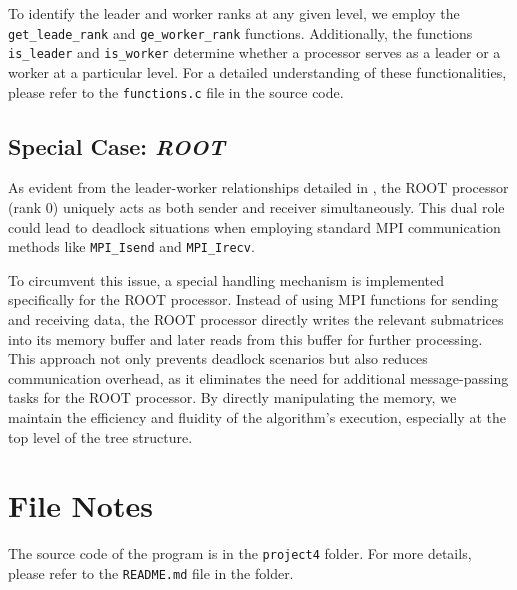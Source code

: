 \documentclass[12pt,a4paper]{article}
\begin{document}
To identify the leader and worker ranks at any given level, we employ the \texttt{get\_leade\_rank} and \texttt{ge\_worker\_rank} functions. Additionally, the functions \texttt{is\_leader} and \texttt{is\_worker} determine whether a processor serves as a leader or a worker at a particular level. For a detailed understanding of these functionalities, please refer to the \texttt{functions.c} file in the source code.

\subsection{Special Case: \textit{ROOT}}
\label{subsec:special_case_root}
As evident from the leader-worker relationships detailed in , the ROOT processor (rank 0) 
 uniquely acts as both sender and receiver simultaneously. 
 This dual role could lead to deadlock situations when employing standard MPI communication methods like \texttt{MPI\_Isend} and \texttt{MPI\_Irecv}.

To circumvent this issue, a special handling mechanism is implemented specifically for the ROOT processor. Instead of using MPI functions for sending and receiving data, the ROOT processor directly writes the relevant submatrices into its memory buffer and later reads from this buffer for further processing. This approach not only prevents deadlock scenarios but also reduces communication overhead, as it eliminates the need for additional message-passing tasks for the ROOT processor. By directly manipulating the memory, we maintain the efficiency and fluidity of the algorithm's execution, especially at the top level of the tree structure.





\section*{File Notes}
The source code of the program is in the \texttt{project4} folder. 
For more details, please refer to the \texttt{README.md} file in the folder.
\end{document}
